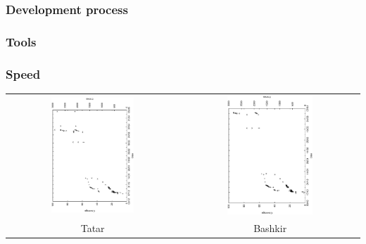 \documentclass[10pt,xetex]{beamer} %
\begin{document}
\begin{frame}
  \frametitle{Development process}

\end{frame}

\begin{frame}
  \frametitle{Tools}

\end{frame}


\begin{frame}
  \frametitle{Speed}

\begin{center}
\begin{tabular}{cc}

\includegraphics[angle=270,width=0.5\textwidth]{hist-tt.ps} &  \includegraphics[angle=270,width=0.5\textwidth]{hist-ba.ps} \\
Tatar & Bashkir \\
\end{tabular}
\end{center}

\end{frame}
\end{document}
